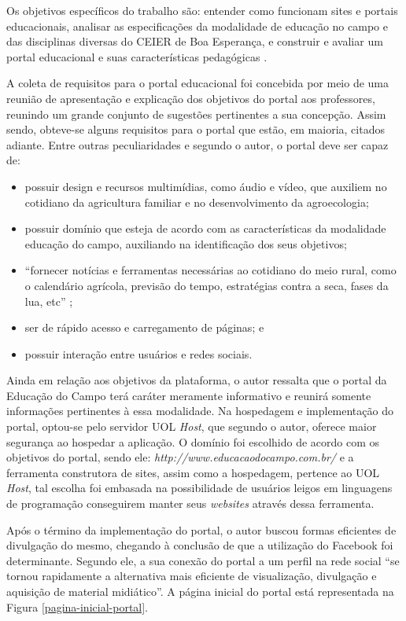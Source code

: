Os objetivos específicos do trabalho são: entender como funcionam sites e portais educacionais, analisar as especificações da modalidade de educação no campo e das disciplinas diversas do CEIER de Boa Esperança, e construir e avaliar um portal educacional e suas características pedagógicas \cite{soares2017construccao}.

A coleta de requisitos para o portal educacional foi concebida por meio de uma reunião de apresentação e explicação dos objetivos do portal aos professores, reunindo um grande conjunto de sugestões pertinentes a sua concepção. Assim sendo, obteve-se alguns requisitos para o portal que estão, em maioria, citados adiante. Entre outras peculiaridades e segundo o autor, o portal deve ser capaz de:

\begin{itemize}
 \item possuir design e recursos multimídias, como áudio e vídeo, que auxiliem no cotidiano da agricultura familiar e no desenvolvimento da agroecologia;
 \item possuir domínio que esteja de acordo com as características da modalidade educação do campo, auxiliando na identificação dos seus objetivos;
 \item ``fornecer notícias e ferramentas necessárias ao cotidiano do meio rural, como o calendário agrícola, previsão do tempo, estratégias contra a seca, fases da lua, etc'' \cite{soares2017construccao};
 \item ser de rápido acesso e carregamento de páginas; e
 \item possuir interação entre usuários e redes sociais.
\end{itemize}

Ainda em relação aos objetivos da plataforma, o autor ressalta que o portal da Educação do Campo terá caráter meramente informativo e reunirá somente informações pertinentes à essa modalidade. Na hospedagem e implementação do portal, optou-se pelo servidor UOL \textit{Host}, que segundo o autor, oferece maior segurança ao hospedar a aplicação. O domínio foi escolhido de acordo com os objetivos do portal, sendo ele: \textit{http://www.educacaodocampo.com.br/} e a ferramenta construtora de sites, assim como a hospedagem, pertence ao UOL \textit{Host}, tal escolha foi embasada na possibilidade de usuários leigos em linguagens de programação conseguirem manter seus \textit{websites} através dessa ferramenta.

Após o término da implementação do portal, o autor buscou formas eficientes de divulgação do mesmo, chegando à conclusão de que a utilização do Facebook foi determinante. Segundo ele, a sua conexão do portal a um perfil na rede social ``se tornou rapidamente a alternativa mais eficiente de visualização, divulgação e aquisição de material midiático''. A página inicial do portal está representada na Figura \ref{pagina-inicial-portal}.

